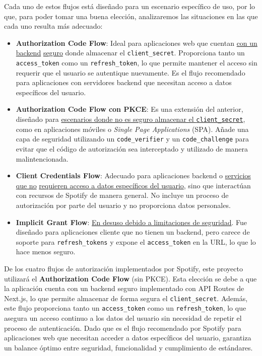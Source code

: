 Cada uno de estos flujos está diseñado para un escenario específico de uso, por lo que, para poder tomar una buena elección, analizaremos las situaciones en las que cada uno resulta más adecuado:

\begin{itemize}
    \item \textbf{Authorization Code Flow}: Ideal para aplicaciones web que cuentan \underline{con un backend} \underline{seguro} donde almacenar el \texttt{client\_secret}. Proporciona tanto un \texttt{access\_token} como un \texttt{refresh\_token}, lo que permite mantener el acceso sin requerir que el usuario se autentique nuevamente. Es el flujo recomendado para aplicaciones con servidores backend que necesitan acceso a datos específicos del usuario.

    \item \textbf{Authorization Code Flow con PKCE}: Es una extensión del anterior, diseñado para \underline{escenarios donde no es seguro almacenar el \texttt{client\_secret}}, como en aplicaciones móviles o \textit{Single Page Applications} (SPA). Añade una capa de seguridad utilizando un \texttt{code\_verifier} y un \texttt{code\_challenge} para evitar que el código de autorización sea interceptado y utilizado de manera malintencionada.

    \item \textbf{Client Credentials Flow}: Adecuado para aplicaciones backend o \underline{servicios que no} \underline{requieren acceso a datos específicos del usuario}, sino que interactúan con recursos de Spotify de manera general. No incluye un proceso de autorización por parte del usuario y no proporciona datos personales.

    \item \textbf{Implicit Grant Flow}: \underline{En desuso debido a limitaciones de seguridad}. Fue diseñado para aplicaciones cliente que no tienen un backend, pero carece de soporte para \texttt{refresh\_tokens} y expone el \texttt{access\_token} en la URL, lo que lo hace menos seguro.
\end{itemize}

De los cuatro flujos de autorización implementados por Spotify, este proyecto utilizará el \textbf{Authorization Code Flow} (sin PKCE). Esta elección se debe a que la aplicación cuenta con un backend seguro implementado con API Routes de Next.js, lo que permite almacenar de forma segura el \texttt{client\_secret}. Además, este flujo proporciona tanto un \texttt{access\_token} como un \texttt{refresh\_token}, lo que asegura un acceso continuo a los datos del usuario sin necesidad de repetir el proceso de autenticación. Dado que es el flujo recomendado por Spotify para aplicaciones web que necesitan acceder a datos específicos del usuario, garantiza un balance óptimo entre seguridad, funcionalidad y cumplimiento de estándares.


